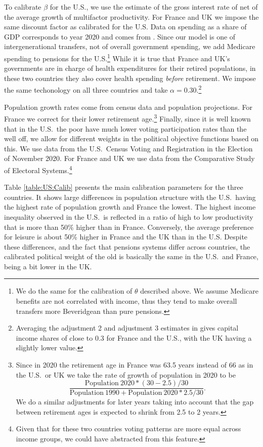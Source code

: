 To calibrate $\beta$ for the U.S., we use the \textcite{mkvss08} estimate of the gross interest rate of net of the average growth of multifactor productivity. For France and UK we impose the same discount factor as calibrated for the U.S. Data on spending as a share of GDP corresponds to year 2020 and comes from \textcite{OECDpen}. Since our model is one of intergenerational transfers, not of overall government spending, we add Medicare spending to pensions for the U.S.\footnote{We do the same for the calibration of $\theta$ described above. We assume Medicare benefits are not correlated with income, thus they tend to make overall transfers more Beveridgean than pure pensions.} While it is true that France and UK's governments are in charge of health expenditures for their retired populations, in these two countries they also cover health spending {\it before} retirement. We impose the same techonology on all three countries and take $\alpha=0.30$.\footnote{Averaging the adjustment 2 and adjustment 3 estimates in \textcite{Gollina1} gives capital income shares of close to 0.3 for France and the U.S., with the UK having a slightly lower value.}

Population growth rates come from census data and population projections. For France we correct for their lower retirement age.\footnote{Since in 2020 the retirement age in France was 63.5 years instead of 66 as in the U.S.\ or UK we take the rate of growth of population in 2020 to be \[
\frac{\mathrm{Population} \ 2020 *(30-2.5)/30}{\mathrm{Population} \ 1990 + \mathrm{Population} \ 2020 *2.5/30}.
\]
We do a similar adjustments for later years taking into account that the gap between retirement ages is expected to shrink from 2.5 to 2 years.} Finally, since it is well known that in the U.S.\ the poor have much lower voting participation rates than the well off, we allow for different weights in the political objective functions based on this. We use data from the U.S.\ Census  Voting and Registration in the Election of November
2020. For France and UK we use data from the Comparative Study of Electoral Systems.\footnote{Given that for these two countries voting patterns are more equal across income groups, we could have abstracted from this feature.}

Table \ref{table:US:Calib} presents the main calibration parameters for the three countries. It shows large differences in population structure with the U.S.\ having the highest rate of population growth and France the lowest. The highest income inequality observed in the U.S.\ is reflected in a ratio of high to low productivity that is more than 50\% higher than in France. Conversely, the average preference for leisure is about 50\% higher in France and the UK than in the U.S. Despite these differences, and the fact that pensions systems differ across countries, the calibrated political weight of the old is basically the same in the U.S.\ and France, being a bit lower in the UK. 

